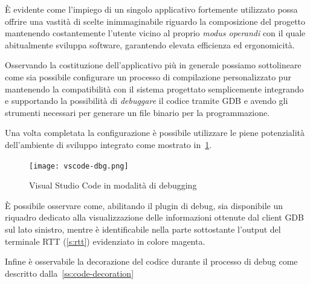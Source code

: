 È evidente come l'impiego di un singolo applicativo fortemente utilizzato possa offrire una vastità di scelte inimmaginabile riguardo la composizione del progetto mantenendo costantemente l'utente vicino al proprio \textit{modus operandi} con il quale abitualmente sviluppa software, garantendo elevata efficienza ed ergonomicità.

Osservando la costituzione dell'applicativo più in generale possiamo sottolineare come sia possibile configurare un processo di compilazione personalizzato pur mantenendo la compatibilità con il sistema progettato semplicemente integrando e supportando la possibilità di \textit{debuggare} il codice tramite GDB e avendo gli strumenti necessari per generare un file binario per la programmazione. 

Una volta completata la configurazione è possibile utilizzare le piene potenzialità dell'ambiente di sviluppo integrato come mostrato in~\cref{fig:vscode-debug}.

\begin{figure}
    \centering
    \texttt{[image: vscode-dbg.png]}
    \caption[Immagine del software Visual Studio Code]{Visual Studio Code in modalità di debugging}\label{fig:vscode-debug}
\end{figure}

È possibile osservare come, abilitando il plugin di debug, sia disponibile un riquadro dedicato alla visualizzazione delle informazioni ottenute dal client GDB sul lato sinistro, mentre è identificabile nella parte sottostante l'output del terminale RTT (\cref{s:rtt}) evidenziato in colore magenta.

Infine è osservabile la decorazione del codice durante il processo di debug come descritto dalla~\cref{ss:code-decoration}